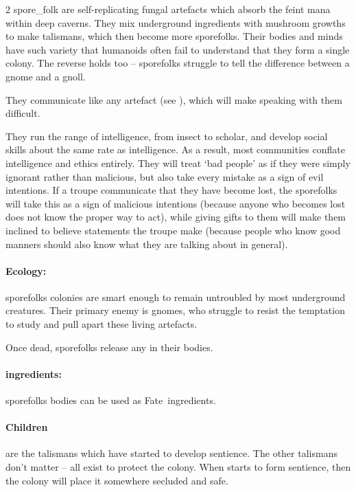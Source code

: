 \begin{multicols}{2}
  {spore_folk}%
are self-replicating fungal \glspl{artefact} which absorb the feint mana within deep caverns.
They mix underground \glspl{ingredient} with mushroom growths to make \glspl{talisman}, which then become more \glspl{sporefolk}.
Their bodies and minds have such variety that humanoids often fail to understand that they form a single colony.
The reverse holds too -- \glspl{sporefolk} struggle to tell the difference between a gnome and a gnoll.

They communicate like any \gls{artefact} (see ), which will make speaking with them difficult.

They run the range of intelligence, from insect to scholar, and develop social skills about the same rate as intelligence.
As a result, most communities conflate intelligence and ethics entirely.
They will treat `bad people' as if they were simply ignorant rather than malicious, but also take every mistake as a sign of evil intentions.
If a troupe communicate that they have become lost, the \glspl{sporefolk} will take this as a sign of malicious intentions (because anyone who becomes lost does not know the proper way to act), while giving gifts to them will make them inclined to believe statements the troupe make (because people who know good manners should also know what they are talking about in general).

\paragraph{Ecology:}
\Glspl{sporefolk} colonies are smart enough to remain untroubled by most underground creatures.
Their primary enemy is gnomes, who struggle to resist the temptation to study and pull apart these living \glspl{artefact}.

Once dead, \glspl{sporefolk} release any  in their bodies.

\paragraph{\Glspl{ingredient}:}
\glspl{sporefolk} bodies can be used as Fate~\glspl{ingredient}.

\paragraph{Children}
are the \glspl{talisman} which have started to develop sentience.
The other \glspl{talisman} don't matter -- all exist to protect the colony.
When  starts to form sentience, then the colony will place it somewhere secluded and safe.


\end{multicols}
